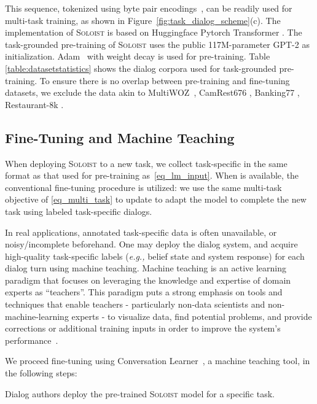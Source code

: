 \documentclass[11pt,a4paper]{article}
\newcommand{\eg}[0]{\emph{e.g., }}
\newcommand{\model}{\textsc{Soloist}}
\begin{document}
This sequence, tokenized using byte pair encodings~\citep{bpe}, can be readily used for multi-task training,
as shown in Figure~\ref{fig:task_dialog_scheme}(c). 
The implementation of \model{} is based on Huggingface Pytorch Transformer \cite{Wolf2019HuggingFacesTS}. 
The task-grounded pre-training of \model{} uses the public 117M-parameter GPT-2 as initialization. 
Adam~\cite{kingma2014adam} with weight decay is used for pre-training. 
Table \ref{table:datasetstatistics} shows the dialog corpora \cite{kim2019eighth,rastogi2019towards,byrne2019taskmaster} used for task-grounded pre-training.  
To ensure there is no overlap between pre-training and fine-tuning datasets, we exclude the data akin to MultiWOZ~\cite{budzianowski2018multiwoz}, CamRest676 \cite{wen2016network}, Banking77 \cite{casanueva2020efficient}, Restaurant-8k \cite{DBLP:conf/acl/CoopeFGVH20}. 

\subsection{Fine-Tuning and Machine Teaching}

When deploying \model{} to a new task, we collect task-specific  in the same format as that used for pre-training as~\eqref{eq_lm_input}.
When  is available, the conventional fine-tuning procedure is utilized: we use the same multi-task objective of \eqref{eq_multi_task} to update  to adapt the model to complete the new task using labeled task-specific dialogs. 

In real applications, annotated task-specific data is often unavailable, or noisy/incomplete beforehand. One may deploy the dialog system, and acquire high-quality task-specific labels (\eg belief state and system response) for each dialog turn using machine teaching.
Machine teaching is an active learning paradigm that focuses on leveraging the knowledge and expertise of domain experts as ``teachers''. This paradigm puts a
strong emphasis on tools and techniques that enable teachers - particularly non-data scientists and
non-machine-learning experts - to visualize data,
find potential problems, and provide corrections or
additional training inputs in order to improve the
system’s performance~\citep{machine-teaching-2017,zhu2015machine,williams2017demonstration,shukla2020conversation}.

We proceed fine-tuning using Conversation Learner~\cite{shukla2020conversation}, a machine teaching tool, in the following steps: 

Dialog authors deploy the pre-trained \model{} model for a specific task.
\end{document}
